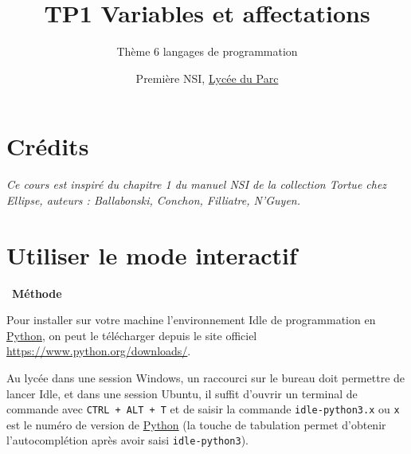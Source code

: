 \documentclass[
  11pt,
]{article}
\title{TP1 Variables et affectations}
\subtitle{Thème 6 langages de programmation}
\author{Première NSI, \href{https://frederic-junier.org/}{Lycée du
Parc}}
\date{}
\newcommand{\passthrough}[1]{#1}
\newcounter{cours}
\newcounter{prog}
\newenvironment{methode}[1]
{\par \medskip    \noindent  
 \begin {bclogo}[arrondi =0.1,logo=\bcoutil, marge=4,noborder = true] {~\textbf{Méthode}   {\itshape #1} }  \par}
{
\end{bclogo}
 \par \bigskip }
\begin{document}
\maketitle

\renewcommand*\contentsname{Table des matières}
{
\hypersetup{linkcolor=}
\setcounter{tocdepth}{3}
\tableofcontents
}
\hypertarget{cruxe9dits}{%
\section*{Crédits}\label{cruxe9dits}}

\emph{Ce cours est inspiré du chapitre 1 du manuel NSI de la collection
Tortue chez Ellipse, auteurs : Ballabonski, Conchon, Filliatre,
N'Guyen.}

\hypertarget{utiliser-le-mode-interactif}{%
\section{Utiliser le mode
interactif}\label{utiliser-le-mode-interactif}}

\begin{methode}{}

Pour installer sur votre machine l'environnement Idle de programmation
en
\href{https://docs.python.org/3/tutorial/datastructures.html}{Python},
on peut le télécharger depuis le site officiel
\url{https://www.python.org/downloads/}.

Au lycée dans une session Windows, un raccourci sur le bureau doit
permettre de lancer Idle, et dans une session Ubuntu, il suffit d'ouvrir
un terminal de commande avec \passthrough{\lstinline!CTRL + ALT + T!} et
de saisir la commande \passthrough{\lstinline!idle-python3.x!} ou
\passthrough{\lstinline!x!} est le numéro de version de
\href{https://docs.python.org/3/tutorial/datastructures.html}{Python}
(la touche de tabulation permet d'obtenir l'autocomplétion après avoir
saisi \passthrough{\lstinline!idle-python3!}).

\end{methode}
\end{document}
